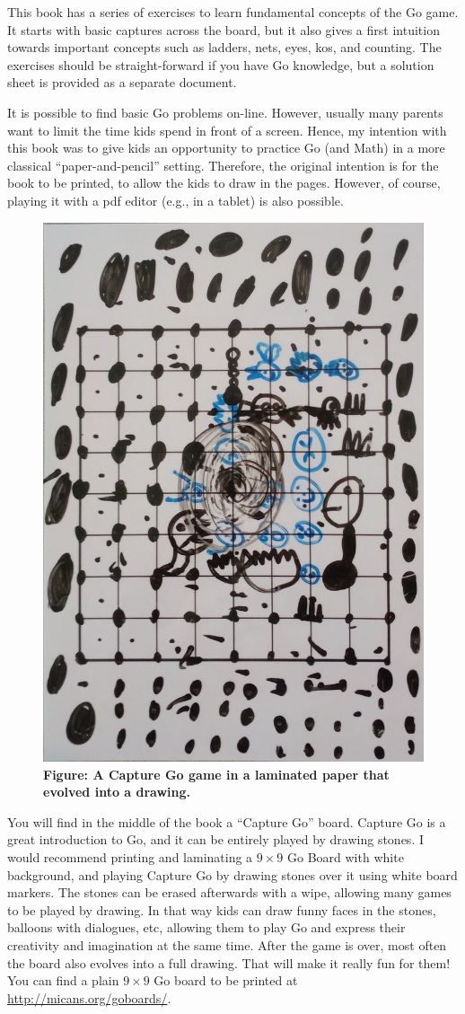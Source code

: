 \documentclass[a4paper,12pt]{extarticle}
\begin{document}
This book has a series of exercises to learn fundamental concepts of the Go game. It starts with basic captures across the board, but it also gives a first intuition towards important concepts such as ladders, nets, eyes, kos, and counting. The exercises should be straight-forward if you have Go knowledge, but a solution sheet is provided as a separate document.

It is possible to find basic Go problems on-line. However, usually many parents want to limit the time kids spend in front of a screen. Hence, my intention with this book was to give kids an opportunity to practice Go (and Math) in a more classical ``paper-and-pencil'' setting. Therefore, the original intention is for the book to be printed, to allow the kids to draw in the pages. However, of course, playing it with a pdf editor (e.g., in a tablet) is also possible.

\begin{figure}
  \includegraphics[width=0.35\columnwidth]{imgs/captureGo.jpg}\\
  \textbf{Figure: A Capture Go game in a laminated paper that evolved into a drawing.}
\end{figure}

You will find in the middle of the book a ``Capture Go'' board. Capture Go is a great introduction to Go, and it can be entirely played by drawing stones. I would recommend printing and laminating a $9 \times 9$ Go Board with white background, and playing Capture Go by drawing stones over it using white board markers. The stones can be erased afterwards with a wipe, allowing many games to be played by drawing. In that way kids can draw funny faces in the stones, balloons with dialogues, etc, allowing them to play Go and express their creativity and imagination at the same time. After the game is over, most often the board also evolves into a full drawing. That will make it really fun for them! You can find a plain $9 \times 9$ Go board to be printed at \url{http://micans.org/goboards/}.
\end{document}
